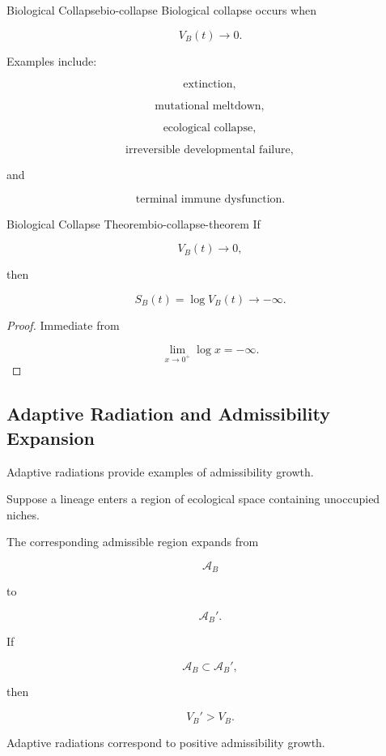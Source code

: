\documentclass[12pt,twoside,openright]{book}
\newenvironment{prop}
{\begin{proposition}{}{}}
{\end{proposition}}
\begin{document}
\begin{definition}{Biological Collapse}{bio-collapse}
Biological collapse occurs when

\[
V_B(t)
\rightarrow0.
\]
\end{definition}

Examples include:

\[
\text{extinction},
\]

\[
\text{mutational meltdown},
\]

\[
\text{ecological collapse},
\]

\[
\text{irreversible developmental failure},
\]

and

\[
\text{terminal immune dysfunction}.
\]

\begin{theorem}{Biological Collapse Theorem}{bio-collapse-theorem}
If

\[
V_B(t)\rightarrow0,
\]

then

\[
S_B(t)
=
\log V_B(t)
\rightarrow
-\infty.
\]
\end{theorem}

\begin{proof}
Immediate from

\[
\lim_{x\to0^+}\log x=-\infty.
\]
\end{proof}

\subsection{ Adaptive Radiation and Admissibility Expansion}

Adaptive radiations provide examples of admissibility
growth.

Suppose a lineage enters a region of ecological space
containing unoccupied niches.

The corresponding admissible region expands from

\[
\mathcal A_B
\]

to

\[
\mathcal A_B'.
\]

If

\[
\mathcal A_B
\subset
\mathcal A_B',
\]

then

\[
V_B'
>
V_B.
\]

\begin{prop}
Adaptive radiations correspond to positive admissibility
growth.
\end{prop}
\end{document}
